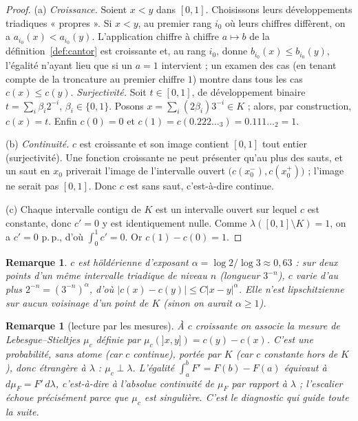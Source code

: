 \documentclass[11pt]{article}
\theoremstyle{thmblue}
\theoremstyle{defplain}
\theoremstyle{rem}
\newtheorem{remarque}[theoreme]{Remarque}
\newcommand{\pp}{p.\,p.}
\newcommand{\abs}[1]{\left\lvert #1 \right\rvert}
\begin{document}
\begin{proof}
(a) \emph{Croissance.} Soient $x<y$ dans $[0,1]$. Choisissons leurs développements triadiques
« propres ». Si $x<y$, au premier rang $i_0$ où leurs chiffres diffèrent, on a $a_{i_0}(x)<a_{i_0}(y)$.
L'application chiffre à chiffre $a\mapsto b$ de la définition~\ref{def:cantor} est croissante et,
au rang $i_0$, donne $b_{i_0}(x)\le b_{i_0}(y)$, l'égalité n'ayant lieu que si un $a=1$ intervient ;
un examen des cas (en tenant compte de la troncature au premier chiffre $1$) montre dans tous les cas
$c(x)\le c(y)$.
\emph{Surjectivité.} Soit $t\in[0,1]$, de développement binaire $t=\sum_i \beta_i2^{-i}$,
$\beta_i\in\{0,1\}$. Posons $x=\sum_i(2\beta_i)3^{-i}\in K$ ; alors, par construction, $c(x)=t$. Enfin
$c(0)=0$ et $c(1)=c(0{.}222\ldots_3)=0{.}111\ldots_2=1$.

(b) \emph{Continuité.} $c$ est croissante et son image contient $[0,1]$ tout entier (surjectivité).
Une fonction croissante ne peut présenter qu'au plus des sauts, et un saut en $x_0$ priverait l'image
de l'intervalle ouvert $\bigl(c(x_0^-),c(x_0^+)\bigr)$ ; l'image ne serait pas $[0,1]$. Donc $c$ est
sans saut, c'est-à-dire continue.

(c) Chaque intervalle contigu de $K$ est un intervalle ouvert sur lequel $c$ est constante, donc
$c'=0$ y est identiquement nulle. Comme $\lambda([0,1]\setminus K)=1$, on a $c'=0$ \pp, d'où
$\int_0^1 c'=0$. Or $c(1)-c(0)=1$.
\end{proof}

\begin{remarque}
$c$ est höldérienne d'exposant $\alpha=\log2/\log3\approx0{,}63$ : sur deux points d'un même intervalle
triadique de niveau $n$ (longueur $3^{-n}$), $c$ varie d'au plus $2^{-n}=(3^{-n})^{\alpha}$, d'où
$\abs{c(x)-c(y)}\le C\abs{x-y}^{\alpha}$. Elle n'est lipschitzienne sur aucun voisinage d'un point de
$K$ (sinon on aurait $\alpha\ge1$).
\end{remarque}

\begin{remarque}[lecture par les mesures]
À $c$ croissante on associe la mesure de Lebesgue--Stieltjes $\mu_c$ définie par
$\mu_c(]x,y])=c(y)-c(x)$. C'est une probabilité, \emph{sans atome} (car $c$ continue), \emph{portée
par $K$} (car $c$ constante hors de $K$), donc \emph{étrangère} à $\lambda$ : $\mu_c\perp\lambda$.
L'égalité $\int_a^b F'=F(b)-F(a)$ équivaut à $d\mu_F=F'\,d\lambda$, c'est-à-dire à l'absolue
continuité de $\mu_F$ par rapport à $\lambda$ ; l'escalier échoue précisément parce que $\mu_c$ est
singulière. C'est le diagnostic qui guide toute la suite.
\end{remarque}
\end{document}
